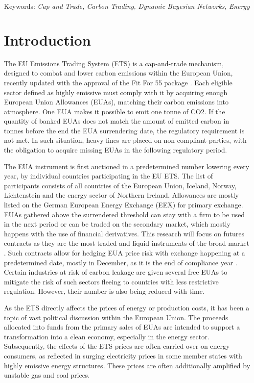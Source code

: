 \documentclass[12pt, letterpaper]{article}
\begin{document}
Keywords: \textit{Cap and Trade, Carbon Trading, Dynamic Bayesian Networks, Energy}

\newpage

\tableofcontents

\newpage

\pagestyle{fancy} 

\section{Introduction}

The EU Emissions Trading System (ETS) is a cap-and-trade mechanism, designed to combat and lower carbon emissions within the European Union, recently updated with the approval of the Fit For 55 package \parencite{ec_ets}. Each eligible sector defined as highly emissive must comply with it by acquiring enough European Union Allowances (EUAs), matching their carbon emissions into atmosphere. One EUA makes it possible to emit one tonne of CO2. If the quantity of banked EUAs does not match the amount of emitted carbon in tonnes before the end the EUA surrendering date, the regulatory requirement is not met. In such situation, heavy fines are placed on non-compliant parties, with the obligation to acquire missing EUAs in the following regulatory period.

The EUA instrument is first auctioned in a predetermined number lowering every year, by individual countries participating in the EU ETS. The list of participants consists of all countries of the European Union, Iceland, Norway, Lichtenstein and the energy sector of Northern Ireland. Allowances are mostly listed on the German European Energy Exchange (EEX) for primary exchange. EUAs gathered above the surrendered threshold can stay with a firm to be used in the next period or can be traded on the secondary market, which mostly happens with the use of financial derivatives. This research will focus on futures contracts as they are the most traded and liquid instruments of the broad market \parencite{esma2024}. Such contracts allow for hedging EUA price risk with exchange happening at a predetermined date, mostly in December, as it is the end of compliance year \parencite{esma2024}. Certain industries at risk of carbon leakage are given several free EUAs to mitigate the risk of such sectors fleeing to countries with less restrictive regulation. However, their number is also being reduced with time. 

As the ETS directly affects the prices of energy or production costs, it has been a topic of vast political discussion within the European Union. The proceeds allocated into funds from the primary sales of EUAs are intended to support a transformation into a clean economy, especially in the energy sector. Subsequently, the effects of the ETS prices are often carried over on energy consumers, as reflected in surging electricity prices in some member states with highly emissive energy structures. These prices are often additionally amplified by unstable gas and coal prices.
\end{document}
